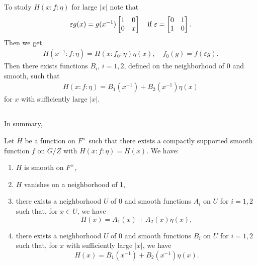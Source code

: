 To study $H(x:f:\eta)$ for large $|x|$ note that
\begin{align*}
    \varepsilon g(x) = g(x^{-1}) \begin{bmatrix} 1 & 0 \\ 0 & x \end{bmatrix}\quad \text{if } \varepsilon = \begin{bmatrix} 0 & 1 \\ 1 & 0 \end{bmatrix}.
\end{align*}
Then we get
\begin{align}
    H(x^{-1}: f: \eta) = H(x:f_0:\eta)\eta(x), \quad f_0(g) = f(\varepsilon g).
\end{align}
Then there exists functions $B_i$, $i = 1, 2$, defined on the neighborhood of 0 and smooth, such that
\begin{align}
    H(x:f:\eta) = B_1(x^{-1}) + B_2(x^{-1})\eta(x)
\end{align}
for $x$ with sufficiently large $|x|$.

\subsection{}
In summary,
\begin{proposition}\label{prop:3.1}
Let $H$ be a function on $F^\times$ such that there exists a compactly supported smooth function $f$ on $G/Z$ with $H(x:f:\eta) =H(x)$.
We have:
\begin{enumerate}
    \item $H$ is smooth on $F^\times$,
    \item $H$ vanishes on a neighborhood of 1,
    \item there exists a neighborhood $U$ of 0 and smooth functions $A_i$ on $U$ for $i = 1, 2$ such that, for $x \in U$, we have
    \[
    H(x) = A_1(x) + A_2(x) \eta(x),
    \]
    \item there exists a neighborhood $U$ of 0 and smooth functions $B_i$ on $U$ for $i = 1, 2$ such that, for $x$ with sufficiently large $|x|$, we have
    \[
    H(x) = B_1(x^{-1}) + B_{2}(x^{-1}) \eta(x).
    \]
\end{enumerate}
\end{proposition}


